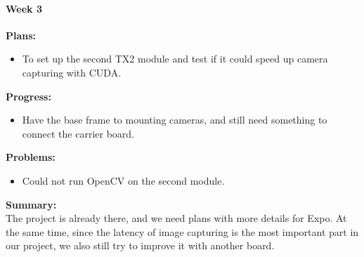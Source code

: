 \paragraph{Week 3}
\begin{adjustwidth}{2.5em}{0pt}
    \vspace{-0.5cm}\textbf{Plans:}
    \vspace{-0.5cm}
    \begin{itemize}
        \item To set up the second TX2 module and test if it could speed up camera capturing with CUDA.
    \end{itemize} 
    \vspace{-0.3cm}\textbf{Progress:}
    \vspace{-0.5cm}
    \begin{itemize}
        \item Have the base frame to mounting cameras, and still need something to connect the carrier board.
    \end{itemize} 
    \vspace{-0.3cm}\textbf{Problems:}
    \vspace{-0.5cm}
    \begin{itemize}
        \item Could not run OpenCV on the second module.
    \end{itemize}  
    \vspace{-0.3cm}\noindent\textbf{Summary:}\\
    \noindent The project is already there, and we need plans with more details for Expo. At the same time, 
    since the latency of image capturing is the most important part in our project, we also still try to improve 
    it with another board. \\
\end{adjustwidth} 

